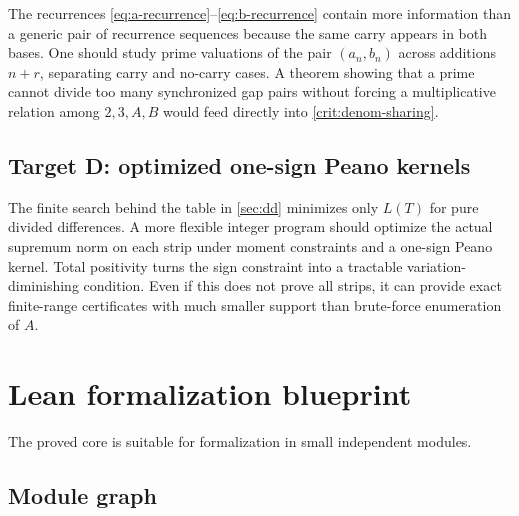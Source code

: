 \documentclass[11pt]{article}
\theoremstyle{definition}
\theoremstyle{remark}
\begin{document}
The recurrences \eqref{eq:a-recurrence}--\eqref{eq:b-recurrence} contain more information than a generic pair of recurrence sequences because the same carry appears in both bases. One should study prime valuations of the pair $(a_n,b_n)$ across additions $n+r$, separating carry and no-carry cases. A theorem showing that a prime cannot divide too many synchronized gap pairs without forcing a multiplicative relation among $2,3,A,B$ would feed directly into \cref{crit:denom-sharing}.

\subsection{Target D: optimized one-sign Peano kernels}

The finite search behind the table in \cref{sec:dd} minimizes only $L(T)$ for pure divided differences. A more flexible integer program should optimize the actual supremum norm on each strip under moment constraints and a one-sign Peano kernel. Total positivity turns the sign constraint into a tractable variation-diminishing condition. Even if this does not prove all strips, it can provide exact finite-range certificates with much smaller support than brute-force enumeration of $A$.

\section{Lean formalization blueprint}\label{sec:lean}

The proved core is suitable for formalization in small independent modules.

\subsection{Module graph}
\end{document}

